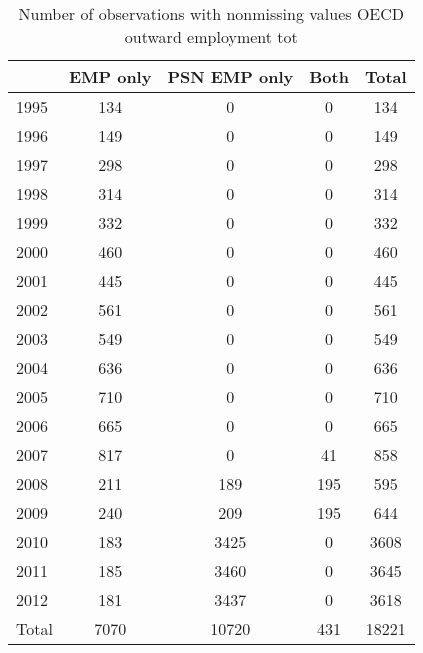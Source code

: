 \begin{table}[htbp]\centering
\caption{Number of observations with nonmissing values OECD outward employment tot}
\begin{tabular}{l*{4}{c}}
\toprule
            &    EMP only&PSN EMP only&        Both&       Total\\
\midrule
1995        &         134&           0&           0&         134\\
1996        &         149&           0&           0&         149\\
1997        &         298&           0&           0&         298\\
1998        &         314&           0&           0&         314\\
1999        &         332&           0&           0&         332\\
2000        &         460&           0&           0&         460\\
2001        &         445&           0&           0&         445\\
2002        &         561&           0&           0&         561\\
2003        &         549&           0&           0&         549\\
2004        &         636&           0&           0&         636\\
2005        &         710&           0&           0&         710\\
2006        &         665&           0&           0&         665\\
2007        &         817&           0&          41&         858\\
2008        &         211&         189&         195&         595\\
2009        &         240&         209&         195&         644\\
2010        &         183&        3425&           0&        3608\\
2011        &         185&        3460&           0&        3645\\
2012        &         181&        3437&           0&        3618\\
Total       &        7070&       10720&         431&       18221\\
\bottomrule
\end{tabular}
\end{table}
